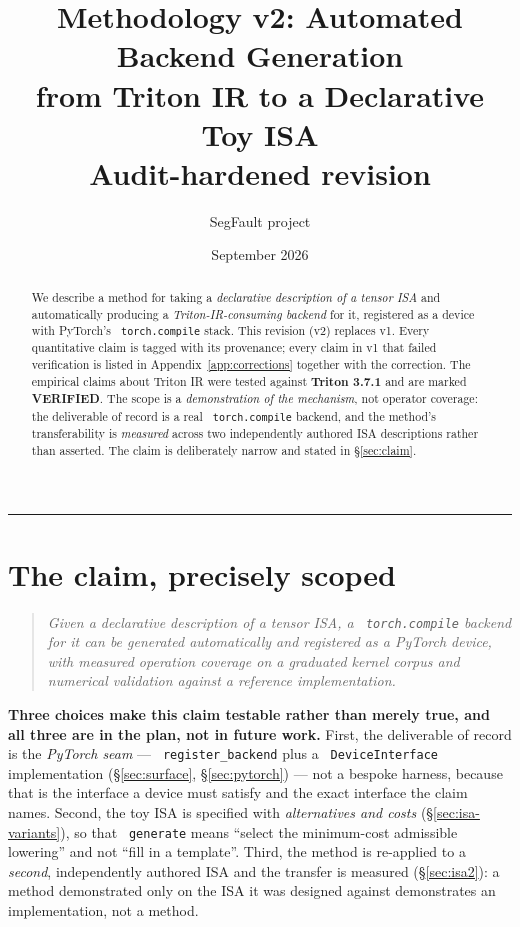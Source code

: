 \documentclass[11pt,a4paper]{article}
\title{\vspace{-1.6cm}\textbf{Methodology v2: Automated Backend Generation\\ from Triton IR to a Declarative Toy ISA}\\[0.4em]
\large Audit-hardened revision}
\author{SegFault project}
\date{September 2026}
\newcommand{\code}[1]{\texttt{\small\hyphenchar\font=45 #1}}
\newcommand{\verified}{\textbf{\textcolor{green!45!black}{VERIFIED}}}
\begin{document}
\maketitle
\vspace{-1.0cm}

\begin{abstract}
\noindent
We describe a method for taking a \emph{declarative description of a tensor ISA} and automatically producing a
\emph{Triton-IR-consuming backend} for it, registered as a device with PyTorch's \code{torch.compile} stack.
This revision (v2) replaces v1. Every quantitative claim is tagged with its provenance; every claim in v1 that
failed verification is listed in Appendix~\ref{app:corrections} together with the correction.
The empirical claims about Triton IR were tested against \textbf{Triton 3.7.1} and are marked \verified{}.
The scope is a \emph{demonstration of the mechanism}, not operator coverage: the deliverable of record is a
real \code{torch.compile} backend, and the method's transferability is \emph{measured} across two
independently authored ISA descriptions rather than asserted. The claim is deliberately narrow and stated in
\S\ref{sec:claim}.
\end{abstract}

\vspace{0.4em}
\noindent\rule{\textwidth}{0.3pt}

\section{The claim, precisely scoped}\label{sec:claim}

\begin{quote}
\itshape
Given a declarative description of a tensor ISA, a \code{torch.compile} backend for it can be generated
automatically and registered as a PyTorch device, with measured operation coverage on a graduated kernel
corpus and numerical validation against a reference implementation.
\end{quote}

\noindent\textbf{Three choices make this claim testable rather than merely true, and all three are in the
plan, not in future work.} First, the deliverable of record is the \emph{PyTorch seam} ---
\code{register\_backend} plus a \code{DeviceInterface} implementation (\S\ref{sec:surface},
\S\ref{sec:pytorch}) --- not a bespoke harness, because that is the interface a device must satisfy and the
exact interface the claim names. Second, the toy ISA is specified with \emph{alternatives and costs}
(\S\ref{sec:isa-variants}), so that \code{generate} means ``select the minimum-cost admissible lowering''
and not ``fill in a template''. Third, the method is re-applied to a \emph{second}, independently authored
ISA and the transfer is measured (\S\ref{sec:isa2}): a method demonstrated only on the ISA it was designed
against demonstrates an implementation, not a method.
\end{document}

